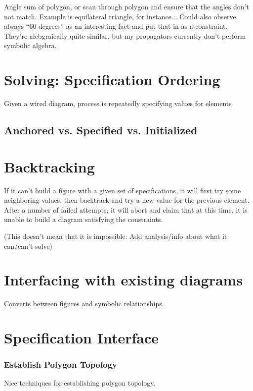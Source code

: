Angle sum of polygon, or scan through polygon and ensure that the
angles don't not match. Example is equilateral triangle, for
instance... Could also observe always ``60 degrees'' as an interesting
fact and put that in as a constraint. They're alebgraically quite
similar, but my propagators currently don't perform symbolic algebra.

\section{Solving: Specification Ordering}

Given a wired diagram, process is repeatedly specifying values for elements

\subsection{Anchored vs. Specified vs. Initialized}

\section{Backtracking}

If it can't build a figure with a given set of specifications, it will
first try some neighboring values, then backtrack and try a new value
for the previous element. After a number of failed attempts, it will
abort and claim that at this time, it is unable to build a diagram
satisfying the constraints.

(This doesn't mean that it is impossible: Add analysis/info about what
it can/can't solve)

\section{Interfacing with existing diagrams}

Converts between figures and symbolic relationships.

\section{Specification Interface}

\subsubsection{Establish Polygon Topology}

Nice techniques for establishing polygon topology.

